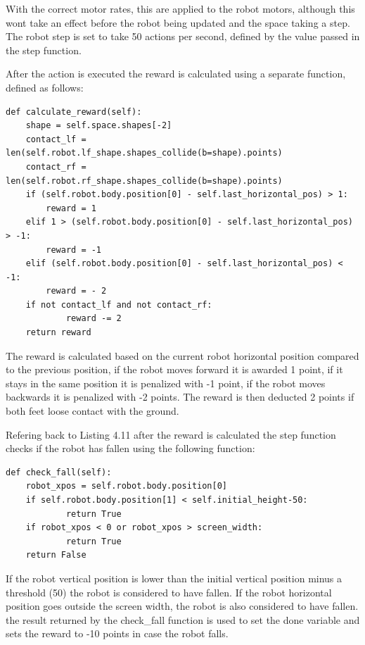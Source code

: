 With the correct motor rates, this are applied to the robot motors, although this wont take an effect before the robot being updated and the space taking a step.
The robot step is set to take 50 actions per second, defined by the value passed in the step function.

After the action is executed the reward is calculated using a separate function, defined as follows:


\begin{lstlisting}
def calculate_reward(self):
    shape = self.space.shapes[-2]
    contact_lf = len(self.robot.lf_shape.shapes_collide(b=shape).points)
    contact_rf = len(self.robot.rf_shape.shapes_collide(b=shape).points)
    if (self.robot.body.position[0] - self.last_horizontal_pos) > 1:
        reward = 1
    elif 1 > (self.robot.body.position[0] - self.last_horizontal_pos) > -1:
        reward = -1
    elif (self.robot.body.position[0] - self.last_horizontal_pos) < -1:
        reward = - 2
    if not contact_lf and not contact_rf:
            reward -= 2
    return reward
\end{lstlisting}

The reward is calculated based on the current robot horizontal position compared to the previous position,
if the robot moves forward it is awarded 1 point, if it stays in the same position it is penalized with -1 point, 
if the robot moves backwards it is penalized with -2 points. The reward is then deducted 2 points if both feet loose contact with the ground.

Refering back to Listing 4.11 after the reward is calculated the step function checks if the robot has fallen using the following function:
\begin{lstlisting}
def check_fall(self):
    robot_xpos = self.robot.body.position[0]
    if self.robot.body.position[1] < self.initial_height-50:
            return True
    if robot_xpos < 0 or robot_xpos > screen_width:
            return True
    return False
\end{lstlisting}

If the robot vertical position is lower than the initial vertical position minus a threshold (50) the robot is considered to have fallen.
If the robot horizontal position goes outside the screen width, the robot is also considered to have fallen. the result returned by the check\_fall function is 
used to set the done variable and sets the reward to -10 points in case the robot falls.

